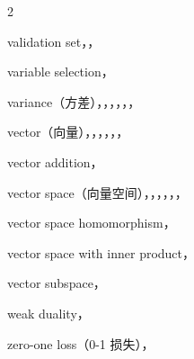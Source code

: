 \begin{multicols}{2}
\medskip{}\par\smallskip
\noindent validation set，，\par
\noindent variable selection，\par
\noindent variance（方差），，，，，，\par
\noindent vector（向量），，，，，，\par
\noindent vector addition，\par
\noindent vector space（向量空间），，，，，，\par
\noindent vector space homomorphism，\par
\noindent vector space with inner product，\par
\noindent vector subspace，\par

\medskip{}\par\smallskip
\noindent weak duality，\par

\medskip{}\par\smallskip
\noindent zero-one loss（0-1 损失），\par
\end{multicols}


